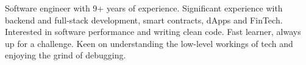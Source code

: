

\vspace{0mm}
\begin{justify}
  Software engineer with 9+ years of experience.\newline
  Significant experience with backend and full-stack development, smart contracts, dApps and FinTech.\newline
  Interested in software performance and writing clean code.\newline
  Fast learner, always up for a challenge. Keen on understanding the low-level workings of tech and enjoying the grind of debugging.
\end{justify}
\vspace{0mm}